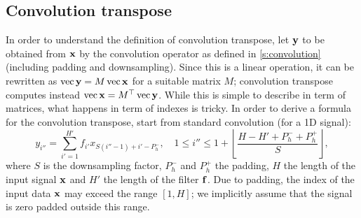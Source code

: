 \subsection{Convolution transpose}\label{s:impl-convolution-transpose}

In order to understand the definition of convolution transpose, let $\mathbf{y}$ to be obtained from $\mathbf{x}$ by the convolution operator as defined in \cref{s:convolution} (including padding and downsampling).  Since this is a linear operation, it can be rewritten as $\operatorname{vec} \mathbf{y} = M \operatorname{vec}\mathbf{x}$ for a suitable matrix $M$; convolution transpose computes instead $\operatorname{vec} \mathbf{x} = M^\top \operatorname{vec} \mathbf{y}$.  While this is simple to describe in term of matrices, what happens in term of indexes is tricky. In order to derive a formula for the convolution transpose, start from standard convolution (for a 1D signal):
\[
y_{i''} = \sum_{i'=1}^{H'} f_{i'} x_{S (i''-1) + i' - P_h^-}, 
\quad
1 \leq i'' \leq 1 + \left\lfloor \frac{H - H' + P_h^- + P_h^+}{S} \right\rfloor,
\]
where $S$ is the downsampling factor, $P_h^-$ and $P_h^+$ the padding, $H$ the length of the input signal $\mathbf{x}$ and $H'$ the length of the filter $\mathbf{f}$. Due to padding, the index of the input data $\mathbf{x}$ may exceed the range $[1,H]$; we implicitly assume that the signal is zero padded outside this range.

